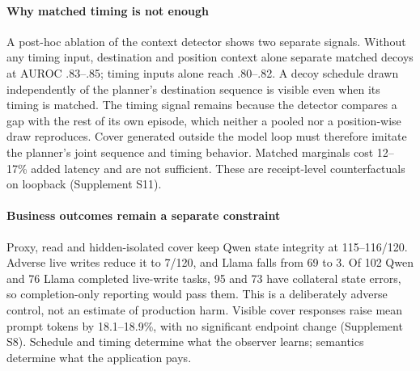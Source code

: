 \paragraph{Why matched timing is not enough}
A post-hoc ablation of the context detector shows two separate signals. Without any timing input, destination and position context alone separate matched decoys at AUROC .83--.85; timing inputs alone reach .80--.82. A decoy schedule drawn independently of the planner's destination sequence is visible even when its timing is matched. The timing signal remains because the detector compares a gap with the rest of its own episode, which neither a pooled nor a position-wise draw reproduces. Cover generated outside the model loop must therefore imitate the planner's joint sequence and timing behavior. Matched marginals cost 12--17\% added latency and are not sufficient. These are receipt-level counterfactuals on loopback (Supplement S11).

\paragraph{Business outcomes remain a separate constraint}
Proxy, read and hidden-isolated cover keep Qwen state integrity at 115--116/120. Adverse live writes reduce it to 7/120, and Llama falls from 69 to 3. Of 102 Qwen and 76 Llama completed live-write tasks, 95 and 73 have collateral state errors, so completion-only reporting would pass them. This is a deliberately adverse control, not an estimate of production harm. Visible cover responses raise mean prompt tokens by 18.1--18.9\%, with no significant endpoint change (Supplement S8). Schedule and timing determine what the observer learns; semantics determine what the application pays.
